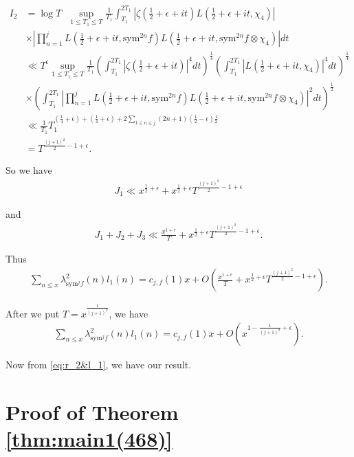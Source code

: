 \documentclass[10pt]{amsart}
\begin{document}
\begin{align}
    I_2 &=\log T \text{ } \sup_{1 \leq T_1 \leq T}\frac{1}{T_1} \int_{T_1}^{2T_1}\left|\zeta(\tfrac{1}{2}+\epsilon+it)L(\tfrac{1}{2}+\epsilon+it, \chi_4) \right| \\ 
    & \times \left|\prod_{n=1}^{j}L(\tfrac{1}{2}+\epsilon+it,\mathrm{sym}^{2n}f)L(\tfrac{1}{2}+\epsilon+it,\mathrm{sym}^{2n}f \otimes \chi_4 )\right| dt \\
    &\ll T^\epsilon \sup_{1 \leq T_1 \leq T}\frac{1}{T_1}\left(  \int_{T_1}^{2T_1}|\zeta(\frac{1}{2}+\epsilon+it)|^{4}dt \right)^\frac{1}{4}\left(\int_{T_1}^{2T_1}|L(\tfrac{1}{2}+\epsilon+it, \chi_4)|^4dt\right)^\frac{1}{4} \\
    & \times \left( \int_{T_1}^{2T_1}\left| \prod_{n=1}^{j}L(\tfrac{1}{2}+\epsilon+it,\mathrm{sym}^{2n}f)L(\tfrac{1}{2}+\epsilon+it,\mathrm{sym}^{2n}f \otimes \chi_4 ) \right|^{2}dt\right)^{\frac{1}{2}}\\
    &\ll \frac{1}{T_1}T_1^{(\frac{1}{4}+\epsilon) + (\frac{1}{4}+\epsilon)+ 2 \sum_{1 \leq n \leq j}(2n+1)(\frac{1}{2}-\epsilon)\frac{1}{2}}\\
    &=  T^{\frac{(j+1)^2}{2}-1+\epsilon}.
\end{align}

So we have \begin{align}
    J_1 \ll x^{\frac{1}{2}+\epsilon} + x^{\frac{1}{2}+\epsilon}T^{\frac{(j+1)^2}{2}-1+\epsilon}
\end{align}

and \begin{align}
    J_1+J_2+J_3 \ll \frac{x^{1+\epsilon}}{T}+ x^{\frac{1}{2}+\epsilon} T^{\frac{(j+1)^2}{2}-1+\epsilon}.
\end{align}

Thus \begin{align}
    \sum_{n\leq x}\lambda_{\mathrm{sym}^{j}f}^2(n)l_1(n) = c_{j,f}(1)x + O \left( \frac{x^{1+\epsilon}}{T}+ x^{\frac{1}{2}+\epsilon} T^{\frac{(j+1)^2}{2}-1+\epsilon} \right).
\end{align}

After we put $T = x^{\frac{1}{(j+1)^2}}$, we have \begin{align}
    \sum_{n\leq x}\lambda_{\mathrm{sym}^{j}f}^2(n)l_1(n) = c_{j,f}(1)x + O \left( x^{1-\frac{1}{(j+1)^2}+\epsilon} \right).
\end{align}

Now from \eqref{eq:r_2&l_1}, we have our result.

\section{Proof of Theorem \ref{thm:main1(468)}} \label{sec:main1(468)}
\end{document}
